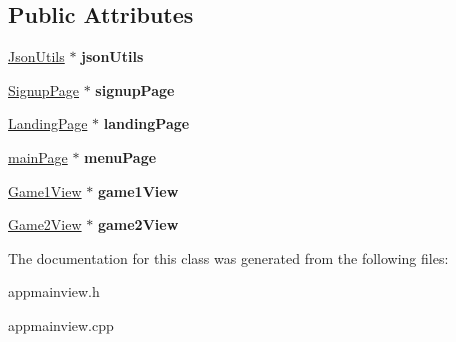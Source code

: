 \subsection*{Public Attributes}
\begin{DoxyCompactItemize}
\item 
\mbox{\label{classAppMainView_ac1993e81b1591959c70fd0dc81ae7675}} 
\hyperlink{classJsonUtils}{Json\+Utils} $\ast$ {\bfseries json\+Utils}
\item 
\mbox{\label{classAppMainView_a6ce48659229761f90082abce3624301e}} 
\hyperlink{classSignupPage}{Signup\+Page} $\ast$ {\bfseries signup\+Page}
\item 
\mbox{\label{classAppMainView_aca2fb901b55b7607addf5fa0a9bcb762}} 
\hyperlink{classLandingPage}{Landing\+Page} $\ast$ {\bfseries landing\+Page}
\item 
\mbox{\label{classAppMainView_a8faef724c48bae43fbe87a9c336ecc8c}} 
\hyperlink{classmainPage}{main\+Page} $\ast$ {\bfseries menu\+Page}
\item 
\mbox{\label{classAppMainView_a57ebafcae52a96567d28734e5bec1298}} 
\hyperlink{classGame1View}{Game1\+View} $\ast$ {\bfseries game1\+View}
\item 
\mbox{\label{classAppMainView_a9380c2ae4d16787838c5819e304d390a}} 
\hyperlink{classGame2View}{Game2\+View} $\ast$ {\bfseries game2\+View}
\end{DoxyCompactItemize}


The documentation for this class was generated from the following files\+:\begin{DoxyCompactItemize}
\item 
appmainview.\+h\item 
appmainview.\+cpp\end{DoxyCompactItemize}
